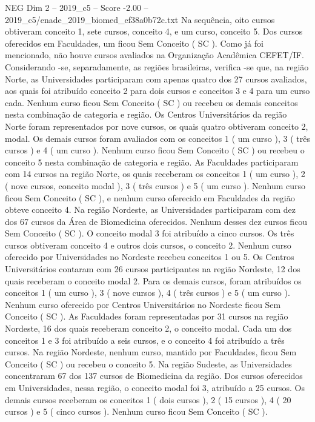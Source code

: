 \begin{textsample}{NEG Dim 2 – 2019\_c5 – Score -2.00 – 2019\_c5/enade\_2019\_biomed\_ef38a0b72c.txt}
Na sequência, oito cursos obtiveram conceito 1, sete cursos, conceito 4, e um curso, conceito 5.
Dos cursos oferecidos em Faculdades, um ficou Sem Conceito ( SC ).
Como já foi mencionado, não houve cursos avaliados na Organização Acadêmica CEFET/IF.
Considerando -se, separadamente, as regiões brasileiras, verifica -se que, na região Norte, as Universidades participaram com apenas quatro dos 27 cursos avaliados, aos quais foi atribuído conceito 2 para dois cursos e conceitos 3 e 4 para um curso cada.
Nenhum curso ficou Sem Conceito ( SC ) ou recebeu os demais conceitos nesta combinação de categoria e região.
Os Centros Universitários da região Norte foram representados por nove cursos, os quais quatro obtiveram conceito 2, modal.
Os demais cursos foram avaliados com os conceitos 1 ( um curso ), 3 ( três cursos ) e 4 ( um curso ).
Nenhum curso ficou Sem Conceito ( SC ) ou recebeu o conceito 5 nesta combinação de categoria e região.
As Faculdades participaram com 14 cursos na região Norte, os quais receberam os conceitos 1 ( um curso ), 2 ( nove cursos, conceito modal ), 3 ( três cursos ) e 5 ( um curso ).
Nenhum curso ficou Sem Conceito ( SC ), e nenhum curso oferecido em Faculdades da região obteve conceito 4.
Na região Nordeste, as Universidades participaram com dez dos 67 cursos da Área de Biomedicina oferecidos.
Nenhum desses dez cursos ficou Sem Conceito ( SC ).
O conceito modal 3 foi atribuído a cinco cursos.
Os três cursos obtiveram conceito 4 e outros dois cursos, o conceito 2.
Nenhum curso oferecido por Universidades no Nordeste recebeu conceitos 1 ou 5.
Os Centros Universitários contaram com 26 cursos participantes na região Nordeste, 12 dos quais receberam o conceito modal 2.
Para os demais cursos, foram atribuídos os conceitos 1 ( um curso ), 3 ( nove cursos ), 4 ( três cursos ) e 5 ( um curso ).
Nenhum curso oferecido por Centros Universitários no Nordeste ficou Sem Conceito ( SC ).
As Faculdades foram representadas por 31 cursos na região Nordeste, 16 dos quais receberam conceito 2, o conceito modal.
Cada um dos conceitos 1 e 3 foi atribuído a seis cursos, e o conceito 4 foi atribuído a três cursos.
Na região Nordeste, nenhum curso, mantido por Faculdades, ficou Sem Conceito ( SC ) ou recebeu o conceito 5.
Na região Sudeste, as Universidades concentraram 67 dos 137 cursos de Biomedicina da região.
Dos cursos oferecidos em Universidades, nessa região, o conceito modal foi 3, atribuído a 25 cursos.
Os demais cursos receberam os conceitos 1 ( dois cursos ), 2 ( 15 cursos ), 4 ( 20 cursos ) e 5 ( cinco cursos ).
Nenhum curso ficou Sem Conceito ( SC ).

\end{textsample}
